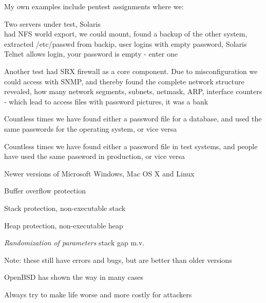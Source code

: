 \documentclass[Screen16to9,17pt]{foils}
\begin{document}
\begin{list1}
\item My own examples include pentest assignments where we:
\begin{list2}
\item Two servers under test, Solaris\\
had NFS world export, we could mount, found a backup of the other system, extracted /etc/passwd from backip, user logins with empty password, Solaris Telnet allows login, your password is empty - enter one
\item Another test had SRX firewall as a core component. Due to misconfiguration we could access with SNMP, and thereby found the complete network structure revealed, how many network segments, subnets, netmask, ARP, interface counters - which lead to access files with password pictures, it was a bank
\item Countless times we have found either a password file for a database, and used the same passwords for the operating system, or vice versa
\item Countless times we have found either a password file in test systems, and people have used the same password in production, or vice versa
\end{list2}
\end{list1}



\begin{list1}
\item Newer versions of Microsoft Windows, Mac OS X and Linux
\begin{list2}
\item Buffer overflow protection
\item Stack protection, non-executable stack
\item Heap protection, non-executable heap
\item \emph{Randomization of parameters} stack gap m.v.
\end{list2}
\item Note: these still have errors and bugs, but are better than older versions
\item OpenBSD has shown the way in many cases\\ 
\end{list1}

\vskip 1cm

\centerline{Always try to make life worse and more costly for attackers}
\end{document}
